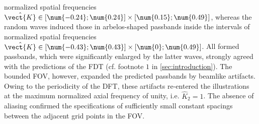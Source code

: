 normalized spatial frequencies
$\hat{\vect{K}} \in [ \num{-0.24}; \num{0.24} ] \times [ \num{0.15}; \num{0.49} ]$, whereas
the random waves induced those in
arbelos-shaped passbands inside
the intervals of
normalized spatial frequencies
$\hat{\vect{K}} \in [ \num{-0.43}; \num{0.43} ] \times [ \num{0}; \num{0.49} ]$.
All formed passbands, which were significantly enlarged by
the latter waves, strongly agreed with
the predictions of
the \ac{FDT}
(cf. footnote $\num{1}$ in \cref{sec:introduction}).
The bounded \ac{FOV}, however, expanded
the predicted passbands by
beamlike artifacts.
Owing to
the periodicity of
the \ac{DFT},
these artifacts re-entered
the illustrations at
the maximum normalized axial frequency of
unity, i.e.
$\hat{K}_{2} = 1$.
The absence of
aliasing confirmed
the specifications of
sufficiently small constant spacings between
the adjacent grid points in
the \ac{FOV}.
